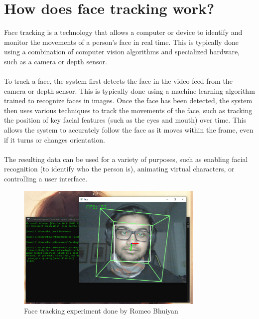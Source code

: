 \section{How does face tracking work?}
Face tracking is a technology that allows a computer or device to identify and monitor the movements of a person's face in real time. This is typically done using a combination of computer vision algorithms and specialized hardware, such as a camera or depth sensor.
\\
\\
To track a face, the system first detects the face in the video feed from the camera or depth sensor. This is typically done using a machine learning algorithm trained to recognize faces in images. Once the face has been detected, the system then uses various techniques to track the movements of the face, such as tracking the position of key facial features (such as the eyes and mouth) over time. This allows the system to accurately follow the face as it moves within the frame, even if it turns or changes orientation.
\\
\\
The resulting data can be used for a variety of purposes, such as enabling facial recognition (to identify who the person is), animating virtual characters, or controlling a user interface.
\\
\begin{figure}[htb]
    \centering
    \includegraphics[width=0.8\textwidth]{pics/bhuiyanfracetracking.png}
    \caption{Face tracking experiment done by Romeo Bhuiyan}
\end{figure}



